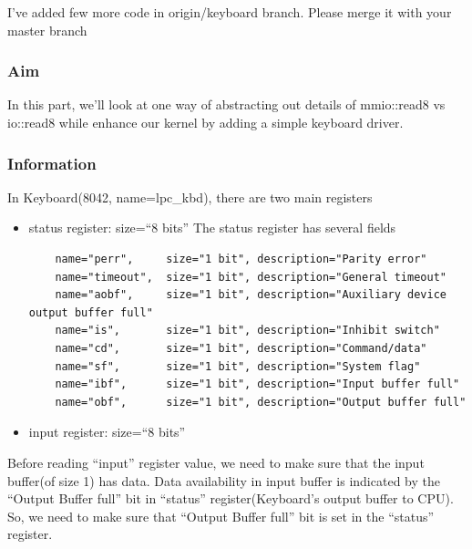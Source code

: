 \documentclass[]{book}
\newenvironment{Shaded}{}{}
\newcommand{\KeywordTok}[1]{\textbf{{#1}}}
\newcommand{\NormalTok}[1]{{#1}}
\begin{document}
I've added few more code in origin/keyboard branch. Please merge it with
your master branch

\begin{Shaded}
\end{Shaded}

\subsubsection*{Aim}\label{aim-2}

In this part, we'll look at one way of abstracting out details of
mmio::read8 vs io::read8 while enhance our kernel by adding a simple
keyboard driver.

\subsubsection*{Information}\label{information-2}

In Keyboard(8042, name=lpc\_kbd), there are two main registers

\begin{itemize}
\item
  status register: size=``8 bits'' The status register has several
  fields

\begin{verbatim}
    name="perr",     size="1 bit", description="Parity error"
    name="timeout",  size="1 bit", description="General timeout"
    name="aobf",     size="1 bit", description="Auxiliary device output buffer full"
    name="is",       size="1 bit", description="Inhibit switch"
    name="cd",       size="1 bit", description="Command/data"
    name="sf",       size="1 bit", description="System flag"
    name="ibf",      size="1 bit", description="Input buffer full"
    name="obf",      size="1 bit", description="Output buffer full"
\end{verbatim}
\item
  input register: size=``8 bits''
\end{itemize}

Before reading ``input'' register value, we need to make sure that the
input buffer(of size 1) has data. Data availability in input buffer is
indicated by the ``Output Buffer full'' bit in ``status''
register(Keyboard's output buffer to CPU). So, we need to make sure that
``Output Buffer full'' bit is set in the ``status'' register.
\end{document}
